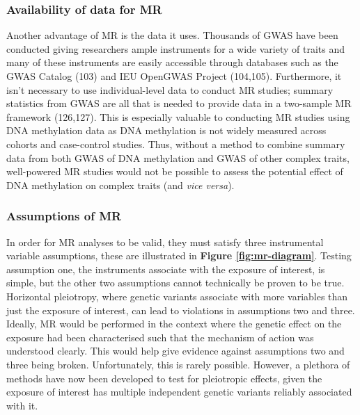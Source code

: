 \documentclass[11pt,twoside]{bristolthesis}
\begin{document}
\hypertarget{availability-of-data-for-mr}{%
\subsubsection{Availability of data for MR}\label{availability-of-data-for-mr}}

Another advantage of MR is the data it uses. Thousands of GWAS have been conducted giving researchers ample instruments for a wide variety of traits and many of these instruments are easily accessible through databases such as the GWAS Catalog (103) and IEU OpenGWAS Project (104,105). Furthermore, it isn't necessary to use individual-level data to conduct MR studies; summary statistics from GWAS are all that is needed to provide data in a two-sample MR framework (126,127). This is especially valuable to conducting MR studies using DNA methylation data as DNA methylation is not widely measured across cohorts and case-control studies. Thus, without a method to combine summary data from both GWAS of DNA methylation and GWAS of other complex traits, well-powered MR studies would not be possible to assess the potential effect of DNA methylation on complex traits (and \emph{vice versa}).

\hypertarget{assumptions-of-mr}{%
\subsubsection{Assumptions of MR}\label{assumptions-of-mr}}

In order for MR analyses to be valid, they must satisfy three instrumental variable assumptions, these are illustrated in \textbf{Figure \ref{fig:mr-diagram}}. Testing assumption one, the instruments associate with the exposure of interest, is simple, but the other two assumptions cannot technically be proven to be true. Horizontal pleiotropy, where genetic variants associate with more variables than just the exposure of interest, can lead to violations in assumptions two and three. Ideally, MR would be performed in the context where the genetic effect on the exposure had been characterised such that the mechanism of action was understood clearly. This would help give evidence against assumptions two and three being broken. Unfortunately, this is rarely possible. However, a plethora of methods have now been developed to test for pleiotropic effects, given the exposure of interest has multiple independent genetic variants reliably associated with it.
\end{document}
